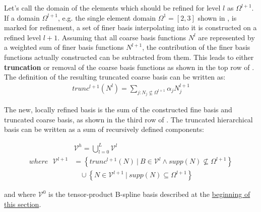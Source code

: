 Let's call the domain of the elements which should be refined for level $l$ as $\Omega^{l+1}$. If a domain $\Omega^{l+1}$, e.g. the single element domain $\Omega^{1} = [2,3]$ shown in , is marked for refinement, a set of finer basis interpolating into it is constructed on a refined level $l+1$. Assuming that all coarse basis functions $N^l$ are represented by a weighted sum of finer basis functions $N^{l+1}$, the contribution of the finer basis functions actually constructed can be subtracted from them. This leads to either \textbf{truncation} or removal of the coarse basis functions as shown in the top row of . The definition of the resulting truncated coarse basis can be written as:
\begin{equation}
\label{eqn:truncation}
\begin{split}
    trunc^{l+1}(N^l) = \sum_{j: N_j \nsubseteq \Omega^{l+1}} \alpha_j N_j^{l+1}
\end{split}{}
\end{equation}{}

The new, locally refined basis is the sum of the constructed fine basis and truncated coarse basis, as shown in the third row of . The truncated hierarchical basis can be written as a sum of recursively defined components:

\begin{equation}
\label{eqn:thb_basis}
\begin{split}
    &\mathcal{V}^{h} = \bigcup_{l=0}^{L} \mathcal{V}^{l} \\
    where ~~~\mathcal{V}^{l+1} &= \left\{ trunc^{l+1}(N) \ | \ B \in \mathcal{V}^l \land supp(N) \nsubseteq \Omega^{l+1}  \right\} \\
    & \ \ \ \ \cup \left\{ N \in \mathcal{V}^{l+1} \ | \ supp(N) \subseteq \Omega^{l+1}  \right\}
\end{split}{}
\end{equation}{}

and where $\mathcal{V}^{0}$ is the tensor-product B-spline basis described at the \hyperref[sec:overview_background]{beginning of this section}.

